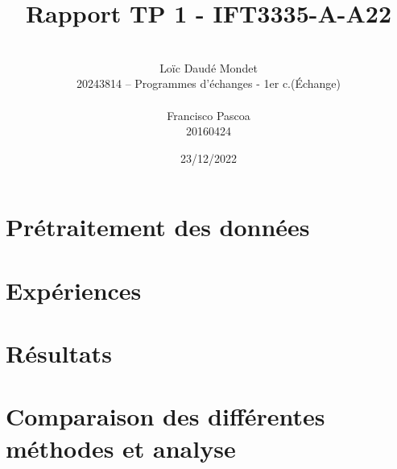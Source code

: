 \documentclass[11pt]{rapport-tp-ia}
\begin{document}
\title{Rapport TP 1 - IFT3335-A-A22}

\author{
	\\Loïc Daudé Mondet
	\\20243814 -- Programmes d'échanges - 1er c.(Échange)
	\\
	\\Francisco Pascoa
	\\20160424
}

\date{23/12/2022}

\maketitle

\chapter{Prétraitement des données}


\chapter{Expériences}


\chapter{Résultats}


\chapter{Comparaison des différentes méthodes et analyse}
\end{document}
